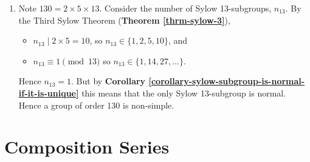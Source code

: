 \begin{enumerate}
    \item Note $130 = 2 \times 5 \times 13$. Consider the number of Sylow 13-subgroups, $n_13$. By the Third Sylow Theorem (\textbf{Theorem \ref{thrm-sylow-3}}),
    \begin{itemize}
        \item $n_13 \mid 2 \times 5 = 10$, so $n_13 \in \{1, 2, 5, 10\}$, and
        \item $n_13 \equiv 1 \pmod{13}$ so $n_13 \in \{1, 14, 27, \dots\}$.
    \end{itemize}
    Hence $n_13 = 1$. But by \textbf{Corollary \ref{corollary-sylow-subgroup-is-normal-if-it-is-unique}} this means that the only Sylow 13-subgroup is normal. Hence a group of order 130 is non-simple.
\end{enumerate}

\section{Composition Series}
